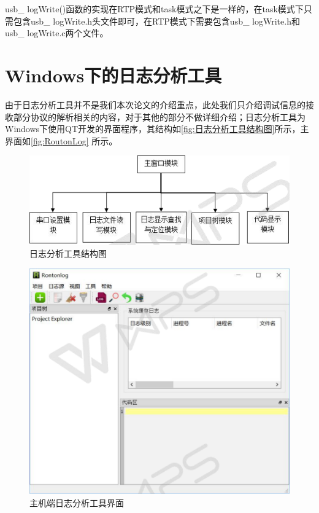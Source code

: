 usb\_ logWrite()函数的实现在RTP模式和task模式之下是一样的，在task模式下只需包含usb\_ logWrite.h头文件即可，在RTP模式下需要包含usb\_ logWrite.h和usb\_ logWrite.c两个文件。


\section{Windows下的日志分析工具}
	
	由于日志分析工具并不是我们本次论文的介绍重点，此处我们只介绍调试信息的接收部分协议的解析相关的内容，对于其他的部分不做详细介绍；日志分析工具为Windows下使用QT开发的界面程序，其结构如\autoref{fig:日志分析工具结构图}所示，主界面如\autoref{fig:RoutonLog} 所示。
\begin{figure}[!h]
\centering
\includegraphics[width=1.0\textwidth]{./graphics/routonLog-system-structure.pdf}
\caption{日志分析工具结构图}\label{fig:日志分析工具结构图}
\end{figure}
\begin{figure}[!h]
\centering
\includegraphics[width=1.0\textwidth]{./graphics/routonLogNoRun.pdf}
\caption{主机端日志分析工具界面}\label{fig:RoutonLog}
\end{figure}\\
